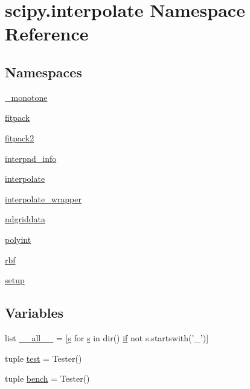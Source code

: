 \hypertarget{namespacescipy_1_1interpolate}{}\section{scipy.\+interpolate Namespace Reference}
\label{namespacescipy_1_1interpolate}
\subsection*{Namespaces}
\begin{DoxyCompactItemize}
\item 
 \hyperlink{namespacescipy_1_1interpolate_1_1__monotone}{\+\_\+monotone}
\item 
 \hyperlink{namespacescipy_1_1interpolate_1_1fitpack}{fitpack}
\item 
 \hyperlink{namespacescipy_1_1interpolate_1_1fitpack2}{fitpack2}
\item 
 \hyperlink{namespacescipy_1_1interpolate_1_1interpnd__info}{interpnd\+\_\+info}
\item 
 \hyperlink{namespacescipy_1_1interpolate_1_1interpolate}{interpolate}
\item 
 \hyperlink{namespacescipy_1_1interpolate_1_1interpolate__wrapper}{interpolate\+\_\+wrapper}
\item 
 \hyperlink{namespacescipy_1_1interpolate_1_1ndgriddata}{ndgriddata}
\item 
 \hyperlink{namespacescipy_1_1interpolate_1_1polyint}{polyint}
\item 
 \hyperlink{namespacescipy_1_1interpolate_1_1rbf}{rbf}
\item 
 \hyperlink{namespacescipy_1_1interpolate_1_1setup}{setup}
\end{DoxyCompactItemize}
\subsection*{Variables}
\begin{DoxyCompactItemize}
\item 
list \hyperlink{namespacescipy_1_1interpolate_a083c488e6f9e17b97923b2b404d877ed}{\+\_\+\+\_\+all\+\_\+\+\_\+} = \mbox{[}\hyperlink{indexexpr_8h_ae024b0db549122b44c349ae28ec990dc}{s} for \hyperlink{indexexpr_8h_ae024b0db549122b44c349ae28ec990dc}{s} in dir() \hyperlink{minmax_8h_a30a0ee9fee303f01d9c5e6f669e0dfe9}{if} not s.\+startswith('\+\_\+')\mbox{]}
\item 
tuple \hyperlink{namespacescipy_1_1interpolate_a24e559174a07a5f61a756e1cf8c85238}{test} = Tester()
\item 
tuple \hyperlink{namespacescipy_1_1interpolate_a6d49ea9757d79c91d1d8df0b91e7b3d2}{bench} = Tester()
\end{DoxyCompactItemize}


